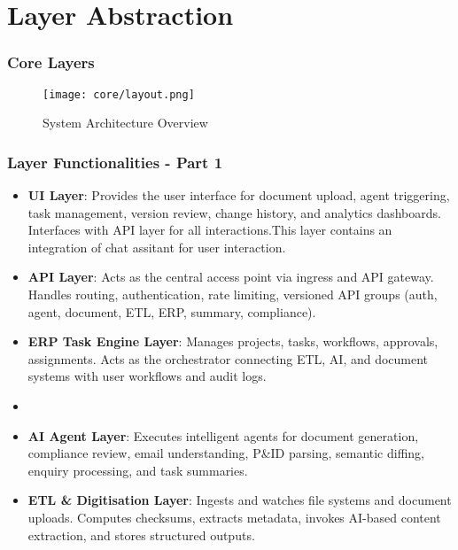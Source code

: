 \section{Layer Abstraction}

\begin{frame}
  \frametitle{Core Layers}
  \begin{figure}
    \centering
    \texttt{[image: core/layout.png]} %
    \caption{System Architecture Overview}
  \end{figure}
\end{frame}



\begin{frame}
  \frametitle{Layer Functionalities - Part 1}
  \begin{itemize}
    \item \textbf{UI Layer}: Provides the user interface for document upload, agent triggering, task management, version review, change history, and analytics dashboards. Interfaces with API layer for all interactions.This layer contains an integration of chat assitant for user interaction.
    \item \textbf{API Layer}: Acts as the central access point via ingress and API gateway. Handles routing, authentication, rate limiting, versioned API groups (auth, agent, document, ETL, ERP, summary, compliance).
    \item \textbf{ERP Task Engine Layer}: Manages projects, tasks, workflows, approvals, assignments. Acts as the orchestrator connecting ETL, AI, and document systems with user workflows and audit logs.
    \item \item \textbf{AI Agent Layer}: Executes intelligent agents for document generation, compliance review, email understanding, P\&ID parsing, semantic diffing, enquiry processing, and task summaries.
    \item \textbf{ETL \& Digitisation Layer}: Ingests and watches file systems and document uploads. Computes checksums, extracts metadata, invokes AI-based content extraction, and stores structured outputs.
  \end{itemize}
\end{frame}



